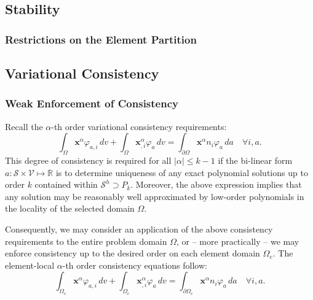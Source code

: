 \subsection*{Stability}


\subsubsection*{Restrictions on the Element Partition}
\subsection*{Variational Consistency}
\subsubsection*{Weak Enforcement of Consistency}


Recall the $\alpha$-th order variational consistency requirements:
\begin{equation}
  \int_\Omega \mathbf{x}^{\alpha} \varphi_{a,i} \, dv + \int_\Omega \mathbf{x}^{\alpha}_{,i} \varphi_a \, dv = \int_{\partial \Omega} \mathbf{x}^{\alpha} n_i \varphi_a \, da \quad \forall i, a.
\end{equation}
This degree of consistency is required for all $| \alpha | \leq k-1$ if the bi-linear form $a : \mathcal{S} \times \mathcal{V} \mapsto \mathbb{R}$ is to determine uniqueness of any exact polynomial solutions up to order $k$ contained within $\mathcal{S}^h \supset P_k$. Moreover, the above expression implies that any solution may be reasonably well approximated by low-order polynomials in the locality of the selected domain $\Omega$.

Consequently, we may consider an application of the above consistency requirements to the entire problem domain $\Omega$, or -- more practically -- we may enforce consistency up to the desired order on each element domain $\Omega_e$. The element-local $\alpha$-th order consistency equations follow:
\begin{equation}
  \int_{\Omega_e} \mathbf{x}^{\alpha} \varphi_{a,i} \, dv + \int_{\Omega_e} \mathbf{x}^{\alpha}_{,i} \varphi_a \, dv = \int_{\partial \Omega_e} \mathbf{x}^{\alpha} n_i \varphi_a \, da \quad \forall i, a.
  \label{eq:consistency3}
\end{equation}

